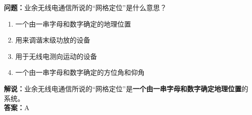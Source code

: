 \bigskip


\noindent\textbf{问题：}业余无线电通信所说的“网格定位”是什么意思？
\begin{enumerate}[label=\Alph*), leftmargin=3em]
	\item 一个由一串字母和数字确定的地理位置
	\item 用来调谐末级功放的设备
	\item 用于无线电测向运动的设备
	\item 一个由一串字母和数字确定的方位角和仰角
\end{enumerate}
\noindent\textbf{解说：}业余无线电通信所说的“网格定位”是\textbf{一个由一串字母和数字确定地理位置}的系统。\\\noindent\textbf{答案：}A

\bigskip

